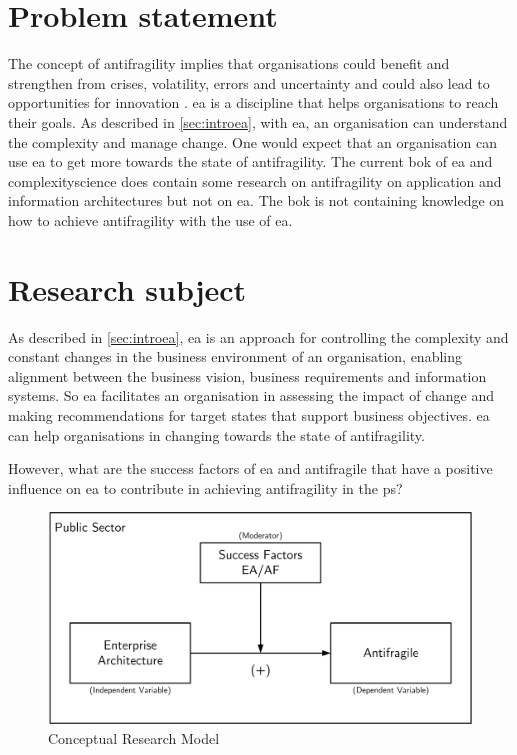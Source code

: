 \section{Problem statement}
\label{sec:problemstatement}
The concept of \gls{antifragility} implies that organisations could benefit and strengthen from crises, volatility, errors and uncertainty and could also lead to opportunities for innovation \parencite{Kastner2017}. \acrshort{ea} is a discipline that helps organisations to reach their goals. As described in \cref{sec:introea}, with \acrshort{ea}, an organisation can understand the complexity and manage change. One would expect that an organisation can use \acrshort{ea} to get more towards the state of \gls{antifragility}. The current \acrfull{bok} of \acrshort{ea} and \gls{complexityscience} does contain some research on \gls{antifragility} on application and information architectures but not on \acrshort{ea}. The \acrshort{bok} is not containing knowledge on how to achieve \gls{antifragility} with the use of \acrshort{ea}.
\section{Research subject}
\label{sec:researchsubject}
As described in \cref{sec:introea},  \acrshort{ea} is an approach for controlling the complexity and constant changes in the business environment of an organisation, enabling alignment between the business vision, business requirements and information systems. So \acrshort{ea} facilitates an organisation in assessing the impact of change and making recommendations for target states that support business objectives. \acrshort{ea} can help organisations in changing towards the state of \gls{antifragility}.

However, what are the success factors of \acrshort{ea} and \gls{antifragile} that have a positive influence on \acrshort{ea} to contribute in achieving \gls{antifragility} in the \gls{ps}? 
\begin{figure}[H]
	\centering
	\includegraphics[width=0.7\linewidth]{images/conceptualmodel}
	\caption[Conceptual Research Model]{Conceptual Research Model}
	\label{fig:conceptualmodel}
\end{figure}

